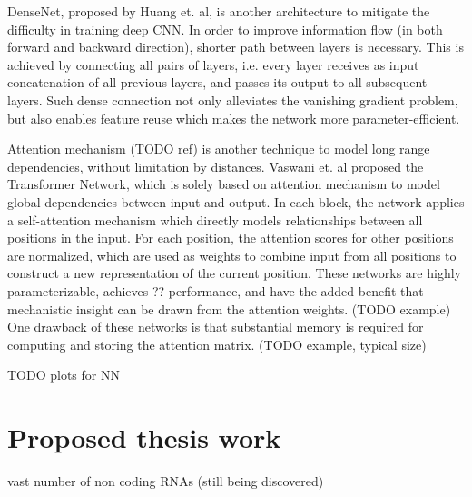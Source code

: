 \documentclass{proposal}
\begin{document}
DenseNet, proposed by Huang et. al\cite{huang2017densely}, is another architecture
to mitigate the difficulty in training deep CNN.
In order to improve information flow (in both forward and backward direction),
shorter path between layers is necessary.
This is achieved by connecting all pairs of layers,
i.e. every layer receives as input concatenation of all previous layers, and passes its output to all subsequent layers.
Such dense connection not only alleviates the vanishing gradient problem, but also enables feature reuse which makes the network more parameter-efficient.



Attention mechanism (TODO ref) is another technique to model long range dependencies,
without limitation by distances.
Vaswani et. al\cite{vaswani2017attention} proposed the Transformer Network,
which is solely based on attention mechanism to model global dependencies between input and output.
In each block, the network applies a self-attention mechanism
which directly models relationships between all positions in the input.
For each position, the attention scores for other positions are normalized,
which are used as weights to combine input from all positions to construct a new representation of the current position.
These networks are highly parameterizable, achieves ?? performance,
and have the added benefit that mechanistic insight can be drawn from the attention weights. (TODO example)
One drawback of these networks is that substantial memory is required for computing and storing the attention matrix.
(TODO example, typical size)


%
%



TODO plots for NN



\section{Proposed thesis work}



vast number of non coding RNAs (still being discovered)
\end{document}
